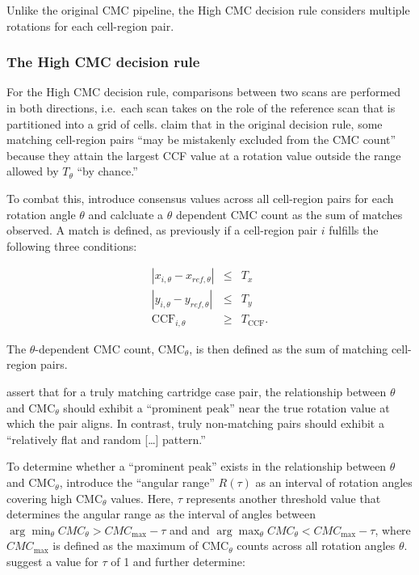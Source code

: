 Unlike the original CMC pipeline, the High CMC decision rule considers
multiple rotations for each cell-region pair.

\hypertarget{highCMCMethod}{%
\subsubsection{The High CMC decision rule}\label{highCMCMethod}}

For the High CMC decision rule, comparisons between two scans are
performed in both directions, i.e.~each scan takes on the role of the
reference scan that is partitioned into a grid of cells.
\citet{tong_improved_2015} claim that in the original decision rule,
some matching cell-region pairs ``may be mistakenly excluded from the
CMC count'' because they attain the largest CCF value at a rotation
value outside the range allowed by \(T_\theta\) ``by chance.''

To combat this, \citet{tong_improved_2015} introduce consensus values
across all cell-region pairs for each rotation angle \(\theta\) and
calcluate a \(\theta\) dependent CMC count as the sum of matches
observed. A match is defined, as previously if a cell-region pair \(i\)
fulfills the following three conditions:

\begin{eqnarray}\label{eqn:high-cmc}
|x_{i,\theta} - x_{ref,\theta}| &\leq& T_x \\ \nonumber
|y_{i,\theta} - y_{ref,\theta}| &\leq& T_y \\ \nonumber
\text{CCF}_{i,\theta} &\geq& T_{\text{CCF}}.
\end{eqnarray}

The \(\theta\)-dependent CMC count, CMC\(_\theta\), is then defined as
the sum of matching cell-region pairs.

\citet{tong_improved_2015} assert that for a truly matching cartridge
case pair, the relationship between \(\theta\) and CMC\(_\theta\) should
exhibit a ``prominent peak'' near the true rotation value at which the
pair aligns. In contrast, truly non-matching pairs should exhibit a
``relatively flat and random {[}\ldots{]} pattern.''

To determine whether a ``prominent peak'' exists in the relationship
between \(\theta\) and CMC\(_\theta\), \citet{tong_improved_2015}
introduce the ``angular range'' \(R (\tau)\) as an interval of rotation
angles covering high CMC\(_\theta\) values. Here, \(\tau\) represents
another threshold value that determines the angular range as the
interval of angles between
\(\arg \min_\theta CMC_\theta > CMC_{\text{max}} - \tau\) and and
\(\arg \max_\theta CMC_\theta < CMC_{\text{max}} - \tau\), where
\(CMC_{\text{max}}\) is defined as the maximum of CMC\(_\theta\) counts
across all rotation angles \(\theta\). \citet{tong_improved_2015}
suggest a value for \(\tau\) of 1 and further determine:

